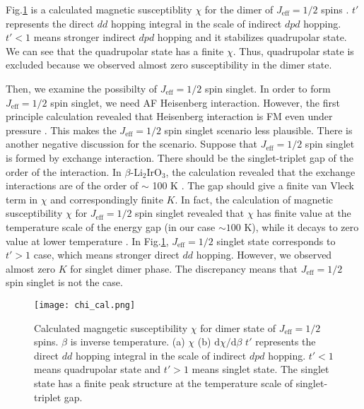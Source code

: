 Fig.\ref{chi_cal} is a calculated magnetic susceptiblity $\chi$ for the dimer of $J_{\mathrm{eff}} = 1/2$ spins \cite{Nasu2014}.
$t'$ represents the direct $dd$ hopping integral in the scale of indirect $dpd$ hopping.
$t' < 1$ means stronger indirect $dpd$ hopping and it stabilizes quadrupolar state.
We can see that the quadrupolar state has a finite $\chi$.
Thus, quadrupolar state is excluded because we observed almost zero susceptibility in the dimer state.

Then, we examine the possibilty of $J_{\mathrm{eff}} = 1/2$ spin singlet.
In order to form $J_{\mathrm{eff}} = 1/2$ spin singlet, we need AF Heisenberg interaction.
However, the first principle calculation revealed that Heisenberg interaction is FM even under pressure \cite{Yadav2018, Kim2016}.
This makes the $J_{\mathrm{eff}} = 1/2$ spin singlet scenario less plausible.
There is another negative discussion for the scenario.
Suppose that $J_{\mathrm{eff}} = 1/2$ spin singlet is formed by exchange interaction.
There should be the singlet-triplet gap of the order of the interaction.
In $\beta$-Li$_2$IrO$_3$, the calculation revealed that the exchange interactions are of the order of $\sim$ 100 K \cite{Yadav2018}.
The gap should give a finite van Vleck term in $\chi$ and correspondingly finite $K$.
In fact, the calculation of magnetic susceptibility $\chi$ for $J_{\mathrm{eff}} = 1/2$ spin singlet revealed that $\chi$ has finite value at the temperature scale of
the energy gap (in our case $\sim 100$ K), while it decays to zero value at lower temperature \cite{Nasu2014}.
In Fig.\ref{chi_cal}, $J_{\mathrm{eff}} = 1/2$ singlet state corresponds to $t' > 1$ case, which means stronger direct $dd$ hopping.
However, we observed almost zero $K$ for singlet dimer phase.
The discrepancy means that $J_{\mathrm{eff}} = 1/2$ spin singlet is not the case.

\begin{figure}
  \centering
  \texttt{[image: chi\_cal.png]}
  \caption{Calculated magngetic susceptibility $\chi$ for dimer state of $J_{\mathrm{eff}} = 1/2$ spins.
  $\beta$ is inverse temperature. \cite{Nasu2014}
  (a) $\chi$
  (b) $\mathrm{d}\chi/\mathrm{d}\beta$
  $t'$ represents the direct $dd$ hopping integral in the scale of indirect $dpd$ hopping.
  $t' < 1$ means quadrupolar state and $t' > 1$ means singlet state.
  The singlet state has a finite peak structure at the temperature scale of singlet-triplet gap.}
  \label{chi_cal}
\end{figure}

